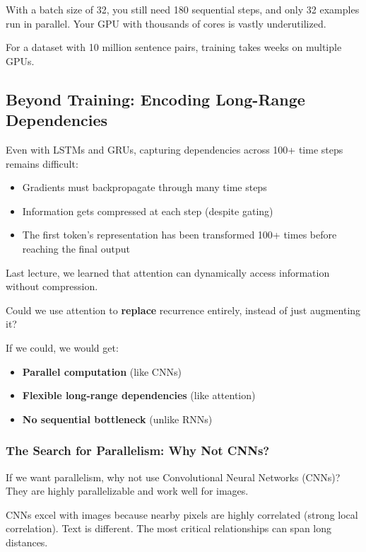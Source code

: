\documentclass{article}
\begin{document}
With a batch size of 32, you still need 180 sequential steps, and only 32 examples run in parallel. Your GPU with thousands of cores is vastly underutilized.

For a dataset with 10 million sentence pairs, training takes weeks on multiple GPUs.

\subsection{Beyond Training: Encoding Long-Range Dependencies}

Even with LSTMs and GRUs, capturing dependencies across 100+ time steps remains difficult:

\begin{itemize}
\item Gradients must backpropagate through many time steps
\item Information gets compressed at each step (despite gating)
\item The first token's representation has been transformed 100+ times before reaching the final output
\end{itemize}

Last lecture, we learned that attention can dynamically access information without compression.

Could we use attention to \textbf{replace} recurrence entirely, instead of just augmenting it?

If we could, we would get:
\begin{itemize}
\item \textbf{Parallel computation} (like CNNs)
\item \textbf{Flexible long-range dependencies} (like attention)
\item \textbf{No sequential bottleneck} (unlike RNNs)
\end{itemize}


\subsubsection{The Search for Parallelism: Why Not CNNs?}

If we want parallelism, why not use Convolutional Neural Networks (CNNs)? They are highly parallelizable and work well for images.

CNNs excel with images because nearby pixels are highly correlated (strong local correlation). Text is different. The most critical relationships can span long distances.
\end{document}
